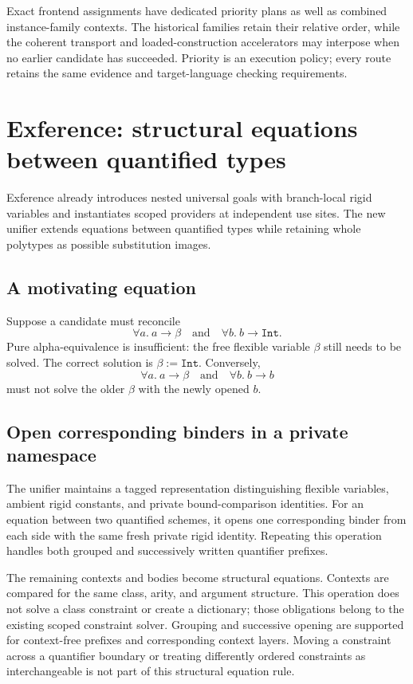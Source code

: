 \documentclass[11pt]{article}
\newcommand{\code}[1]{\texttt{#1}}
\begin{document}
Exact frontend assignments have dedicated priority plans as well as combined
instance-family contexts. The historical families retain their relative
order, while the coherent transport and loaded-construction accelerators may
interpose when no earlier candidate has succeeded. Priority is an execution
policy; every route retains the same evidence and target-language checking
requirements.

\section{Exference: structural equations between quantified types}

Exference already introduces nested universal goals with branch-local rigid
variables and instantiates scoped providers at independent use sites. The
new unifier extends equations between quantified types while retaining whole
polytypes as possible substitution images.

\subsection{A motivating equation}

Suppose a candidate must reconcile
\[
 \forall a.\ a\to \beta
 \quad\text{and}\quad
 \forall b.\ b\to \code{Int}.
\]
Pure alpha-equivalence is insufficient: the free flexible variable $\beta$
still needs to be solved. The correct solution is $\beta:=\code{Int}$.
Conversely,
\[
 \forall a.\ a\to\beta
 \quad\text{and}\quad
 \forall b.\ b\to b
\]
must not solve the older $\beta$ with the newly opened $b$.

\subsection{Open corresponding binders in a private namespace}

The unifier maintains a tagged representation distinguishing flexible
variables, ambient rigid constants, and private bound-comparison identities.
For an equation between two quantified schemes, it opens one corresponding
binder from each side with the same fresh private rigid identity. Repeating
this operation handles both grouped and successively written quantifier
prefixes.

The remaining contexts and bodies become structural equations. Contexts are
compared for the same class, arity, and argument structure. This operation
does not solve a class constraint or create a dictionary; those obligations
belong to the existing scoped constraint solver.
Grouping and successive opening are supported for context-free prefixes and
corresponding context layers. Moving a constraint across a quantifier boundary
or treating differently ordered constraints as interchangeable is not part
of this structural equation rule.
\end{document}
